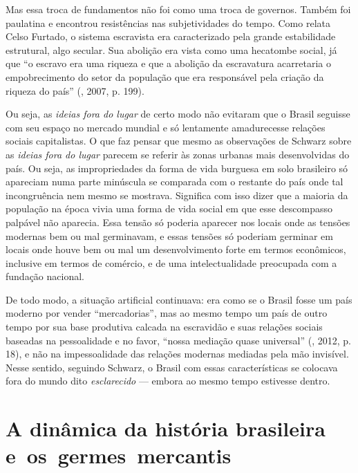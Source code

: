 Mas essa troca de fundamentos não foi como uma troca de governos. Também
foi paulatina e encontrou resistências nas subjetividades do tempo. Como
relata Celso Furtado, o sistema escravista era caracterizado pela grande
estabilidade estrutural, algo secular. Sua abolição era vista como uma
hecatombe social, já que ``o escravo era uma riqueza e que a abolição da
escravatura acarretaria o empobrecimento do setor da população que era
responsável pela criação da riqueza do país'' (, 2007, p. 199).

Ou seja, as \emph{ideias fora do lugar} de certo modo não evitaram que o
Brasil seguisse com seu espaço no mercado mundial e só lentamente
amadurecesse relações sociais capitalistas. O que faz pensar que mesmo
as observações de Schwarz sobre as \emph{ideias fora do lugar} parecem
se referir às zonas urbanas mais desenvolvidas do país. Ou seja, as
impropriedades da forma de vida burguesa em solo brasileiro só apareciam
numa parte minúscula se comparada com o restante do país onde tal
incongruência nem mesmo se mostrava. Significa com isso dizer que a
maioria da população na época vivia uma forma de vida social em que esse
descompasso palpável não aparecia. Essa tensão só poderia aparecer nos locais
onde as tensões modernas bem ou mal germinavam, e essas tensões só
poderiam germinar em locais onde houve bem ou mal um desenvolvimento
forte em termos econômicos, inclusive em termos de comércio, e de uma
intelectualidade preocupada com a fundação nacional.

De todo modo, a situação artificial continuava: era como se o Brasil
fosse um país moderno por vender ``mercadorias'', mas ao mesmo tempo um
país de outro tempo por sua base produtiva calcada na escravidão e suas
relações sociais baseadas na pessoalidade e no favor, ``nossa mediação
quase universal'' (, 2012, p. 18), e não na impessoalidade das
relações modernas mediadas pela mão invisível. Nesse sentido,
seguindo Schwarz, o Brasil com essas características se colocava fora do
mundo dito \emph{esclarecido} --- embora ao mesmo tempo estivesse dentro.

\section{A dinâmica da história brasileira e~os~germes~mercantis}

